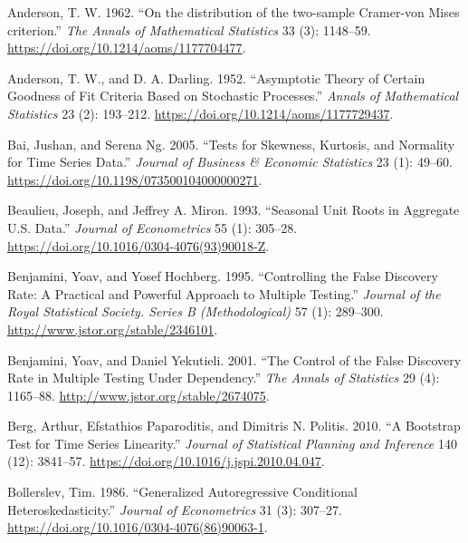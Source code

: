 \hypertarget{refs}{}
\begin{CSLReferences}{1}{0}
\leavevmode{}%
Anderson, T. W. 1962. {``{On the distribution of the two-sample Cramer-von Mises criterion}.''} \emph{The Annals of Mathematical Statistics} 33 (3): 1148--59. \url{https://doi.org/10.1214/aoms/1177704477}.

\leavevmode{}%
Anderson, T. W., and D. A. Darling. 1952. {``Asymptotic Theory of Certain Goodness of Fit Criteria Based on Stochastic Processes.''} \emph{Annals of Mathematical Statistics} 23 (2): 193--212. \url{https://doi.org/10.1214/aoms/1177729437}.

\leavevmode{}%
Bai, Jushan, and Serena Ng. 2005. {``Tests for Skewness, Kurtosis, and Normality for Time Series Data.''} \emph{Journal of Business \& Economic Statistics} 23 (1): 49--60. \url{https://doi.org/10.1198/073500104000000271}.

\leavevmode{}%
Beaulieu, Joseph, and Jeffrey A. Miron. 1993. {``Seasonal Unit Roots in Aggregate {U.S.} Data.''} \emph{Journal of Econometrics} 55 (1): 305--28. \url{https://doi.org/10.1016/0304-4076(93)90018-Z}.

\leavevmode{}%
Benjamini, Yoav, and Yosef Hochberg. 1995. {``Controlling the False Discovery Rate: A Practical and Powerful Approach to Multiple Testing.''} \emph{Journal of the Royal Statistical Society. Series B (Methodological)} 57 (1): 289--300. \url{http://www.jstor.org/stable/2346101}.

\leavevmode{}%
Benjamini, Yoav, and Daniel Yekutieli. 2001. {``The Control of the False Discovery Rate in Multiple Testing Under Dependency.''} \emph{The Annals of Statistics} 29 (4): 1165--88. \url{http://www.jstor.org/stable/2674075}.

\leavevmode{}%
Berg, Arthur, Efstathios Paparoditis, and Dimitris N. Politis. 2010. {``A Bootstrap Test for Time Series Linearity.''} \emph{Journal of Statistical Planning and Inference} 140 (12): 3841--57. \url{https://doi.org/10.1016/j.jspi.2010.04.047}.

\leavevmode{}%
Bollerslev, Tim. 1986. {``Generalized Autoregressive Conditional Heteroskedasticity.''} \emph{Journal of Econometrics} 31 (3): 307--27. \url{https://doi.org/10.1016/0304-4076(86)90063-1}.


\end{CSLReferences}
